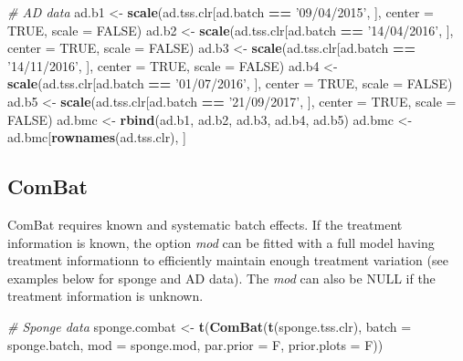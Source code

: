 \documentclass[]{book}
\newenvironment{Shaded}{\begin{snugshade}}{\end{snugshade}}
\newcommand{\KeywordTok}[1]{\textcolor[rgb]{0.13,0.29,0.53}{\textbf{#1}}}
\newcommand{\DataTypeTok}[1]{\textcolor[rgb]{0.13,0.29,0.53}{#1}}
\newcommand{\StringTok}[1]{\textcolor[rgb]{0.31,0.60,0.02}{#1}}
\newcommand{\CommentTok}[1]{\textcolor[rgb]{0.56,0.35,0.01}{\textit{#1}}}
\newcommand{\OtherTok}[1]{\textcolor[rgb]{0.56,0.35,0.01}{#1}}
\newcommand{\OperatorTok}[1]{\textcolor[rgb]{0.81,0.36,0.00}{\textbf{#1}}}
\newcommand{\NormalTok}[1]{#1}
\begin{document}
\begin{Shaded}
\begin{Highlighting}[]
\CommentTok{# AD data}
\NormalTok{ad.b1 <-}\StringTok{ }\KeywordTok{scale}\NormalTok{(ad.tss.clr[ad.batch }\OperatorTok{==}\StringTok{ '09/04/2015'}\NormalTok{, ], }\DataTypeTok{center =} \OtherTok{TRUE}\NormalTok{, }\DataTypeTok{scale =} \OtherTok{FALSE}\NormalTok{)}
\NormalTok{ad.b2 <-}\StringTok{ }\KeywordTok{scale}\NormalTok{(ad.tss.clr[ad.batch }\OperatorTok{==}\StringTok{ '14/04/2016'}\NormalTok{, ], }\DataTypeTok{center =} \OtherTok{TRUE}\NormalTok{, }\DataTypeTok{scale =} \OtherTok{FALSE}\NormalTok{)}
\NormalTok{ad.b3 <-}\StringTok{ }\KeywordTok{scale}\NormalTok{(ad.tss.clr[ad.batch }\OperatorTok{==}\StringTok{ '14/11/2016'}\NormalTok{, ], }\DataTypeTok{center =} \OtherTok{TRUE}\NormalTok{, }\DataTypeTok{scale =} \OtherTok{FALSE}\NormalTok{)}
\NormalTok{ad.b4 <-}\StringTok{ }\KeywordTok{scale}\NormalTok{(ad.tss.clr[ad.batch }\OperatorTok{==}\StringTok{ '01/07/2016'}\NormalTok{, ], }\DataTypeTok{center =} \OtherTok{TRUE}\NormalTok{, }\DataTypeTok{scale =} \OtherTok{FALSE}\NormalTok{)}
\NormalTok{ad.b5 <-}\StringTok{ }\KeywordTok{scale}\NormalTok{(ad.tss.clr[ad.batch }\OperatorTok{==}\StringTok{ '21/09/2017'}\NormalTok{, ], }\DataTypeTok{center =} \OtherTok{TRUE}\NormalTok{, }\DataTypeTok{scale =} \OtherTok{FALSE}\NormalTok{)}
\NormalTok{ad.bmc <-}\StringTok{ }\KeywordTok{rbind}\NormalTok{(ad.b1, ad.b2, ad.b3, ad.b4, ad.b5)}
\NormalTok{ad.bmc <-}\StringTok{ }\NormalTok{ad.bmc[}\KeywordTok{rownames}\NormalTok{(ad.tss.clr), ]}
\end{Highlighting}
\end{Shaded}

\subsection{ComBat}\label{combat}

ComBat requires known and systematic batch effects. If the treatment
information is known, the option \emph{mod} can be fitted with a full
model having treatment informationn to efficiently maintain enough
treatment variation (see examples below for sponge and AD data). The
\emph{mod} can also be NULL if the treatment information is unknown.

\begin{Shaded}
\begin{Highlighting}[]
\CommentTok{# Sponge data}
\NormalTok{sponge.combat <-}\StringTok{ }\KeywordTok{t}\NormalTok{(}\KeywordTok{ComBat}\NormalTok{(}\KeywordTok{t}\NormalTok{(sponge.tss.clr), }\DataTypeTok{batch =}\NormalTok{ sponge.batch, }
                          \DataTypeTok{mod =}\NormalTok{ sponge.mod, }\DataTypeTok{par.prior =}\NormalTok{ F, }\DataTypeTok{prior.plots =}\NormalTok{ F))}
\end{Highlighting}
\end{Shaded}
\end{document}

